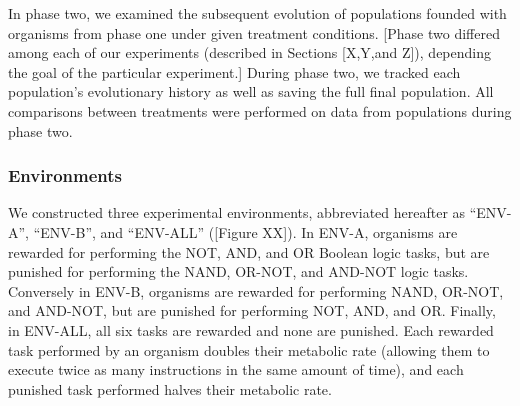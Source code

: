 In phase two, we examined the subsequent evolution of populations founded with organisms from phase one under given treatment conditions.
[Phase two differed among each of our experiments (described in Sections [X,Y,and Z]), depending the goal of the particular experiment.]
During phase two, we tracked each population's evolutionary history as well as saving the full final population.
All comparisons between treatments were performed on data from populations during phase two.


\subsubsection{Environments}
\label{sec:methods:experiment:environments}


We constructed three experimental environments, abbreviated hereafter as ``ENV-A'', ``ENV-B'', and ``ENV-ALL'' ([Figure XX]).
In ENV-A, organisms are rewarded for performing the NOT, AND, and OR Boolean logic tasks, but are punished for performing the NAND, OR-NOT, and AND-NOT logic tasks.
Conversely in ENV-B, organisms are rewarded for performing NAND, OR-NOT, and AND-NOT, but are punished for performing NOT, AND, and OR. 
Finally, in ENV-ALL, all six tasks are rewarded and none are punished.
Each rewarded task performed by an organism doubles their metabolic rate (allowing them to execute twice as many instructions in the same amount of time), and each punished task performed halves their metabolic rate. 

